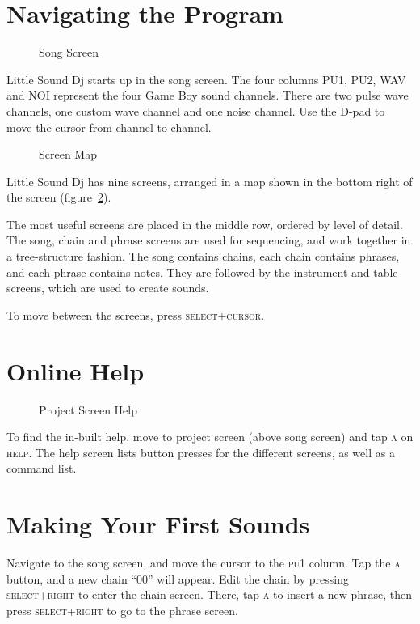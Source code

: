 \section{Navigating the Program}

\begin{figure}[hbtp]
\centering
{}
\caption{Song Screen}
\label{fig:song}
\end{figure}

Little Sound Dj starts up in the song screen.
The four columns \textsc{PU1, PU2, WAV} and \textsc{NOI} represent the four Game Boy sound channels.
There are two pulse wave channels, one custom wave channel and one noise channel.
Use the D-pad to move the cursor from channel to channel.

\begin{figure}[hbtp]
\centering
{}
\caption{Screen Map}
\label{fig:map}
\end{figure}

Little Sound Dj has nine screens, arranged in a map shown in the
bottom right of the screen (figure~\ref{fig:map}). 

The most useful screens are placed in the middle row, ordered by level of detail. 
The song, chain and phrase screens are used for sequencing, and work together in a tree-structure
fashion.  The song contains chains, each chain contains phrases, and each phrase contains notes.
They are followed by the instrument and table screens, which are used to create sounds.

To move between the screens, press \textsc{select+cursor}.

\section{Online Help}

\begin{figure}[hbtp]
	\centering
	\caption{Project Screen Help}
\end{figure}

To find the in-built help, move to project screen (above song screen) and tap \textsc{a} on \textsc{help}.
The help screen lists button presses for the different screens, as well as a command list.

\section{Making Your First Sounds}
Navigate to the song screen, and move the cursor to the \textsc{pu1} column. Tap the \textsc{a} button,
and a new chain ``00'' will appear.
Edit the chain by pressing \textsc{select+right} to enter the chain screen.
There, tap \textsc{a} to insert a new phrase, then press \textsc{select+right} to go to the phrase screen.


